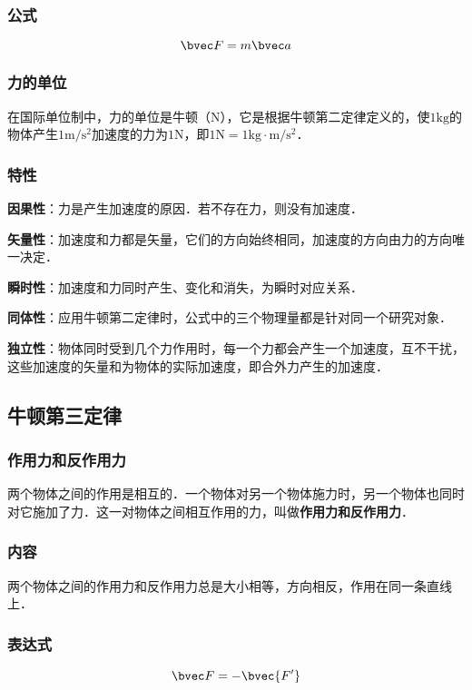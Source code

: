 \subsubsection{公式}
\begin{equation}
\bvec F=m\bvec a
\end{equation}

\subsubsection{力的单位}
在国际单位制中，力的单位是牛顿（$\mathrm N$），它是根据牛顿第二定律定义的，使$1\mathrm{kg}$的物体产生$1\mathrm{m/s^2}$加速度的力为$1\mathrm N$，即$1\mathrm N=1\mathrm{kg \cdot m/s^2}$．

\subsubsection{特性}
\textbf{因果性}：力是产生加速度的原因．若不存在力，则没有加速度．

\textbf{矢量性}：加速度和力都是矢量，它们的方向始终相同，加速度的方向由力的方向唯一决定．

\textbf{瞬时性}：加速度和力同时产生、变化和消失，为瞬时对应关系．

\textbf{同体性}：应用牛顿第二定律时，公式中的三个物理量都是针对同一个研究对象．

\textbf{独立性}：物体同时受到几个力作用时，每一个力都会产生一个加速度，互不干扰，这些加速度的矢量和为物体的实际加速度，即合外力产生的加速度．

\subsection{牛顿第三定律}
\subsubsection{作用力和反作用力}
两个物体之间的作用是相互的．一个物体对另一个物体施力时，另一个物体也同时对它施加了力．这一对物体之间相互作用的力，叫做\textbf{作用力和反作用力}．

\subsubsection{内容}
两个物体之间的作用力和反作用力总是大小相等，方向相反，作用在同一条直线上．

\subsubsection{表达式}
\begin{equation}
\bvec F=-\bvec {F'}
\end{equation}

